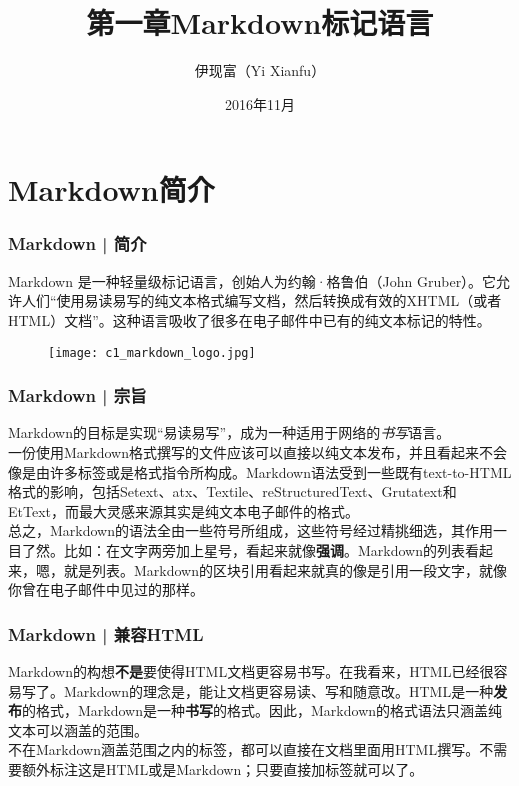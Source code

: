 



\title[Markdown]{第一章\quad Markdown标记语言}
\author[Yixf]{伊现富（Yi Xianfu）}
\date{2016年11月}



\section{Markdown简介}
\begin{frame}
  \frametitle{Markdown | 简介}
  Markdown 是一种轻量级标记语言，创始人为约翰·格鲁伯（John Gruber）。它允许人们“使用易读易写的纯文本格式编写文档，然后转换成有效的XHTML（或者HTML）文档”。这种语言吸收了很多在电子邮件中已有的纯文本标记的特性。
  \begin{figure}
    \centering
    \texttt{[image: c1\_markdown\_logo.jpg]}
  \end{figure}
\end{frame}

\begin{frame}
  \frametitle{Markdown | 宗旨}
  Markdown的目标是实现“易读易写”，成为一种适用于网络的\textit{书写}语言。\\
  \vspace{1em}
一份使用Markdown格式撰写的文件应该可以直接以纯文本发布，并且看起来不会像是由许多标签或是格式指令所构成。Markdown语法受到一些既有text-to-HTML格式的影响，包括Setext、atx、Textile、reStructuredText、Grutatext和EtText，而最大灵感来源其实是纯文本电子邮件的格式。\\
  \vspace{1em}
总之，Markdown的语法全由一些符号所组成，这些符号经过精挑细选，其作用一目了然。比如：在文字两旁加上星号，看起来就像\textbf{强调}。Markdown的列表看起来，嗯，就是列表。Markdown的区块引用看起来就真的像是引用一段文字，就像你曾在电子邮件中见过的那样。
\end{frame}

\begin{frame}
  \frametitle{Markdown | 兼容HTML}
Markdown的构想\textbf{不是}要使得HTML文档更容易书写。在我看来，HTML已经很容易写了。Markdown的理念是，能让文档更容易读、写和随意改。HTML是一种\textbf{发布}的格式，Markdown是一种\textbf{书写}的格式。因此，Markdown的格式语法只涵盖纯文本可以涵盖的范围。\\
  \vspace{1em}
不在Markdown涵盖范围之内的标签，都可以直接在文档里面用HTML撰写。不需要额外标注这是HTML或是Markdown；只要直接加标签就可以了。
\end{frame}


